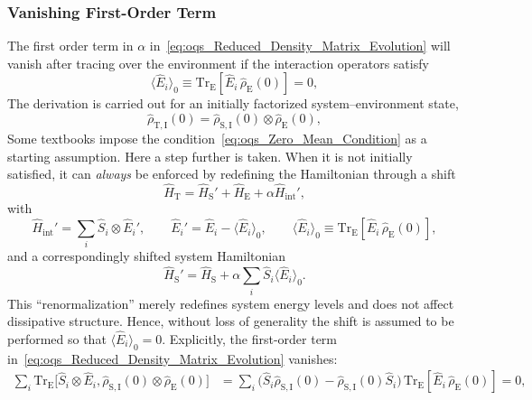 \subsubsection{Vanishing First-Order Term}

The first order term in $\alpha$ in~\autoref{eq:oqs_Reduced_Density_Matrix_Evolution} will vanish after tracing over the environment if the interaction operators satisfy
\begin{equation}
	\langle \hat{E}_i \rangle_0 \equiv \mathrm{Tr}_{\mathrm{E}}[\hat{E}_i \, \hat{\rho}_{\mathrm{E}}(0)] = 0,
	\label{eq:oqs_Zero_Mean_Condition}
\end{equation}
The derivation is carried out for an initially factorized system--environment state,
\begin{equation}
	\hat{\rho}_{\mathrm{T},\mathrm{I}}(0) = \hat{\rho}_{\mathrm{S},\mathrm{I}}(0) \otimes \hat{\rho}_{\mathrm{E}}(0),
	\label{eq:oqs_Initial_Product_State}
\end{equation}
Some textbooks impose the condition~\autoref{eq:oqs_Zero_Mean_Condition} as a starting assumption. Here a step further is taken. When it is not initially satisfied, it can \emph{always} be enforced by redefining the Hamiltonian through a shift
\begin{equation*}
	\hat{H}_{\mathrm{T}} = \hat{H}_{\mathrm{S}}' + \hat{H}_{\mathrm{E}} + \alpha \hat{H}_{\mathrm{int}}',
\end{equation*}
with
\begin{equation*}
	\hat{H}_{\mathrm{int}}' = \sum_i \hat{S}_i \otimes \hat{E}_i', \qquad \hat{E}_i' = \hat{E}_i - \langle \hat{E}_i \rangle_0, \qquad \langle \hat{E}_i \rangle_0 \equiv \mathrm{Tr}_{\mathrm{E}}[\hat{E}_i \, \hat{\rho}_{\mathrm{E}}(0)],
\end{equation*}
and a correspondingly shifted system Hamiltonian
\begin{equation*}
	\hat{H}_{\mathrm{S}}' = \hat{H}_{\mathrm{S}} + \alpha \sum_i \hat{S}_i \langle \hat{E}_i \rangle_0.
\end{equation*}
This ``renormalization'' merely redefines system energy levels and does not affect dissipative structure. Hence, without loss of generality the shift is assumed to be performed so that $\langle \hat{E}_i \rangle_0 = 0$. Explicitly, the first-order term in~\autoref{eq:oqs_Reduced_Density_Matrix_Evolution} vanishes:
\begin{align*}
	\sum_i \mathrm{Tr}_{\mathrm{E}}\big[ \hat{S}_i \otimes \hat{E}_i, \hat{\rho}_{\mathrm{S},\mathrm{I}}(0) \otimes \hat{\rho}_{\mathrm{E}}(0)\big]
	 & = \sum_i \big(\hat{S}_i \hat{\rho}_{\mathrm{S},\mathrm{I}}(0) - \hat{\rho}_{\mathrm{S},\mathrm{I}}(0) \hat{S}_i\big) \, \mathrm{Tr}_{\mathrm{E}}[\hat{E}_i \, \hat{\rho}_{\mathrm{E}}(0)] = 0,
\end{align*}
